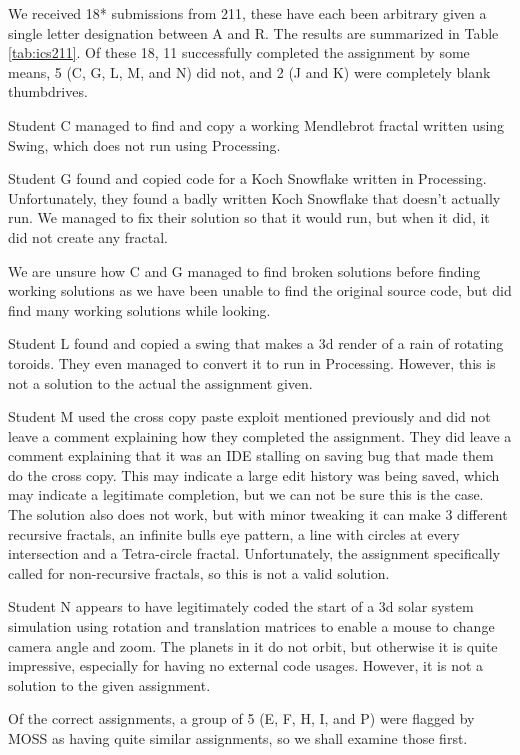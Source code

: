 \documentclass[10pt]{article}
\begin{document}
We received 18* submissions from 211, these have each been arbitrary given a single letter designation between A and R.  The results are summarized in Table \ref{tab:ics211}.  Of these 18, 11 successfully completed the assignment by some means, 5 (C, G, L, M, and N) did not, and 2 (J and K) were completely blank thumbdrives.

Student C managed to find and copy a working Mendlebrot fractal written using Swing, which does not run using Processing.

Student G found and copied code for a Koch Snowflake written in Processing.  Unfortunately, they found a badly written Koch Snowflake that doesn't actually run.  We managed to fix their solution so that it would run, but when it did, it did not create any fractal.

We are unsure how C and G managed to find broken solutions before finding working solutions as we have been unable to find the original source code, but did find many working solutions while looking.

Student L found and copied a swing that makes a 3d render of a rain of rotating toroids.  They even managed to convert it to run in Processing.  However, this is not a solution to the actual the assignment given.

Student M used the cross copy paste exploit mentioned previously and did not leave a comment explaining how they completed the assignment.  They did leave a comment explaining that it was an IDE stalling on saving bug that made them do the cross copy.  This may indicate a large edit history was being saved, which may indicate a legitimate completion, but we can not be sure this is the case.  The solution also does not work, but with minor tweaking it can make 3 different recursive fractals, an infinite bulls eye pattern, a line with circles at every intersection and a Tetra-circle fractal.   Unfortunately, the assignment specifically called for non-recursive fractals, so this is not a valid solution.

Student N appears to have legitimately coded the start of a 3d solar system simulation using rotation and translation matrices to enable a mouse to change camera angle and zoom.  The planets in it do not orbit, but otherwise it is quite impressive, especially for having no external code usages.  However, it is not a solution to the given assignment.

Of the correct assignments, a group of 5 (E, F, H, I, and P) were flagged by MOSS as having quite similar assignments, so we shall examine those first.
\end{document}
